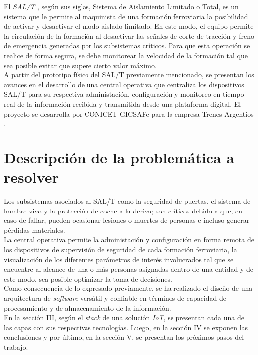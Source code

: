 \documentclass[a4paper]{IEEEtran}
\begin{document}
El \textit{SAL/T} \cite{b1}, según sus siglas, Sistema de Aislamiento Limitado o Total, es un sistema que le permite al maquinista de una formación ferroviaria la posibilidad de activar y desactivar el modo aislado limitado. En este modo, el equipo permite la circulación de la formación al desactivar las señales de corte de tracción y freno de emergencia generadas por los subsistemas críticos. Para que esta operación se realice de forma segura, se debe monitorear la velocidad de la formación tal que sea posible evitar que supere cierto valor máximo.\\

A partir del prototipo físico del SAL/T previamente mencionado, se presentan los avances en el desarrollo de una central operativa que centraliza los dispositivos SAL/T para su respectiva administación, configuración y monitoreo en tiempo real de la información recibida y transmitida desde una plataforma digital. El proyecto se desarrolla por CONICET-GICSAFe \cite{b2} para la empresa Trenes Argentios \cite{b3}. 


\section{Descripción de la problemática a resolver}

Los subsistemas asociados al SAL/T como la seguridad de puertas, el sistema de hombre vivo y la protección de coche a la deriva; son críticos debido a que, en caso de fallar, pueden ocasionar lesiones o muertes de personas e incluso generar pérdidas materiales. \\ 

La central operativa permite la administación y configuración en forma remota de los dispositivos de supervisión de seguridad de cada formación ferroviaria, la visualización de los diferentes parámetros de interés involucrados tal que se encuentre al alcance de una o más personas asignadas dentro de una entidad y de este modo, sea posible optimizar la toma de decisiones. \\

Como consecuencia de lo expresado previamente, se ha realizado el diseño de una arquitectura de \textit{software} versátil y confiable en términos de capacidad de procesamiento y de almacenamiento de la información. \\

En la sección III, según el \textit{stack} \cite{b4} de una solución \textit{IoT}, se presentan cada una de las capas con sus respectivas tecnologías. Luego, en la sección IV se exponen las conclusiones y por último, en la sección V, se presentan los próximos pasos del trabajo.
\end{document}
